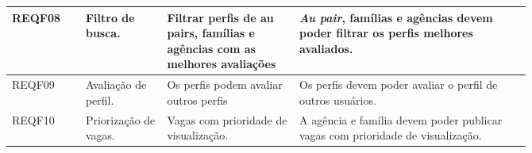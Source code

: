\begin{enumerate}
\begin{quadro}[H]
\begin{tabular}{|p{0.10\linewidth} | p{0.11\linewidth} | p{0.2\linewidth} | p{0.35\linewidth} |}
        REQF08 &
          Filtro de busca. &
          Filtrar perfis de  au pairs, famílias e agências com as melhores avaliações & 
          \emph{Au pair}, famílias e agências devem poder filtrar os perfis melhores avaliados. \\ \hline
          
        REQF09 & 
            Avaliação de perfil. & 
            Os perfis podem avaliar outros perfis & Os perfis devem poder avaliar o perfil de outros usuários.                                  \\ \hline
        REQF10 &
          Priorização de vagas. &
          Vagas com prioridade de visualização. &
          A agência e família devem poder publicar vagas com prioridade de visualização. \\ \hline
          
        \end{tabular}
    \end{quadro}
\end{enumerate}
